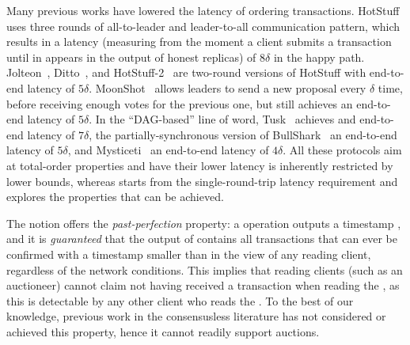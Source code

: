 Many previous works have lowered the latency of ordering transactions.
HotStuff~\cite{DBLP:conf/podc/YinMRGA19} uses three rounds of all-to-leader and leader-to-all communication pattern, which results in a latency (measuring from the moment a client submits a transaction until in appears in the output of honest replicas) of $8\delta$ in the happy path.
Jolteon~\cite{DBLP:conf/fc/GelashviliKSSX22}, Ditto~\cite{DBLP:conf/fc/GelashviliKSSX22}, and HotStuff-2~\cite{DBLP:journals/iacr/MalkhiN23} are two-round versions of HotStuff with end-to-end latency of $5\delta$.
MoonShot~\cite{DBLP:journals/corr/abs-2401-01791} allows leaders to send a new proposal every $\delta$ time, before receiving enough votes for the previous one, but still achieves an end-to-end latency of $5\delta$.
In the ``DAG-based'' line of word, Tusk~\cite{DBLP:conf/eurosys/DanezisKSS22} achieves and end-to-end latency of $7\delta$,
the partially-synchronous version of BullShark~\cite{DBLP:journals/corr/abs-2209-05633} an end-to-end latency of $5\delta$,
and Mysticeti~\cite{DBLP:journals/corr/abs-2310-14821} an end-to-end latency of $4\delta$.
All these protocols aim at total-order properties and have their lower latency is inherently restricted by lower bounds, whereas \podtm starts from the single-round-trip latency requirement and explores the properties that can be achieved.


The \podtm notion offers the \emph{past-perfection} property:
a \opread{} operation outputs a timestamp \rperf, and it is \emph{guaranteed}
that the output of \opread{} contains all transactions that can ever be confirmed with a timestamp smaller than \rperf in the view of any reading client, regardless of the network conditions.
This implies that reading clients (such as an auctioneer) cannot claim not having received a transaction when reading the \podtm, as this is detectable by any other client who reads the \podtm.
To the best of our knowledge, previous work in the consensusless literature has not considered or achieved this property,
hence it cannot readily support auctions.


